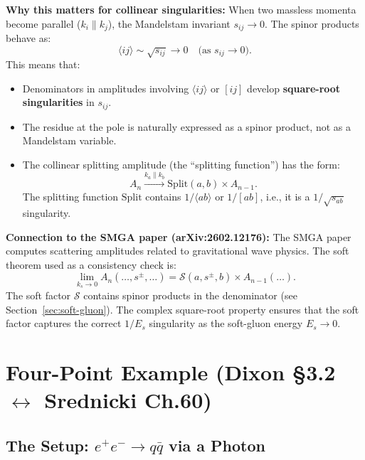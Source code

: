 \textbf{Why this matters for collinear singularities:}
When two massless momenta become parallel ($k_i\parallel k_j$), the Mandelstam invariant
$s_{ij}\to 0$. The spinor products behave as:
\begin{equation}
  \langle ij\rangle \sim \sqrt{s_{ij}} \to 0 \quad\text{(as }s_{ij}\to 0\text{)}.
\end{equation}
This means that:
\begin{itemize}
  \item Denominators in amplitudes involving $\langle ij\rangle$ or $[ij]$ develop
        \textbf{square-root singularities} in $s_{ij}$.
  \item The residue at the pole is naturally expressed as a spinor product, not as
        a Mandelstam variable.
  \item The collinear splitting amplitude (the ``splitting function'') has the form:
        \begin{equation}
          A_n \xrightarrow{k_a\parallel k_b} \mathrm{Split}(a,b)\times A_{n-1}.
        \end{equation}
        The splitting function $\mathrm{Split}$ contains $1/\langle ab\rangle$ or $1/[ab]$,
        i.e., it is a $1/\sqrt{s_{ab}}$ singularity.
\end{itemize}

\textbf{Connection to the SMGA paper (arXiv:2602.12176):}
The SMGA paper computes scattering amplitudes related to gravitational wave physics.
The soft theorem used as a consistency check is:
\begin{equation}
  \lim_{k_s\to 0} A_n(\ldots,s^\pm,\ldots) = \mathcal{S}(a,s^\pm,b)\times A_{n-1}(\ldots).
\end{equation}
The soft factor $\mathcal{S}$ contains spinor products in the denominator (see Section~\ref{sec:soft-gluon}).
The complex square-root property ensures that the soft factor captures the correct
$1/E_s$ singularity as the soft-gluon energy $E_s\to0$.


\section{Four-Point Example (Dixon \S3.2 $\leftrightarrow$ Srednicki Ch.60)}
\label{sec:four-point}

\subsection{The Setup: $e^+e^-\to q\bar{q}$ via a Photon}

